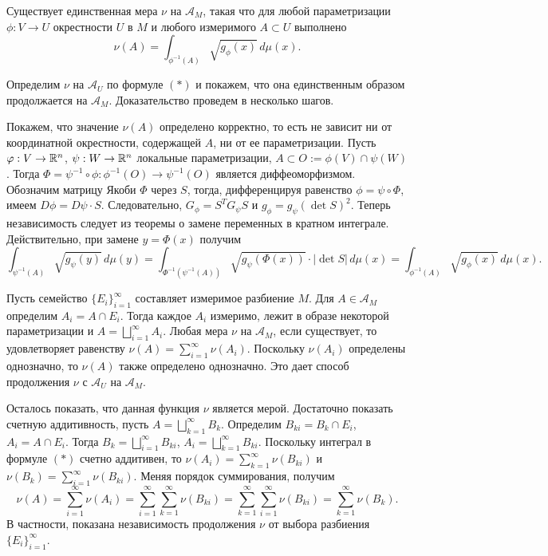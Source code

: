 

\begin{theorem}
	Существует единственная мера $\nu$ на $\mathcal{A}_M$, такая что для любой параметризации $\phi : V \to U$ окрестности $U$ в $M$ и любого измеримого $A \subset U$ выполнено 
	\[ \nu(A) = \int_{\phi^{-1}(A)} \sqrt{g_{\phi}(x)} \, d \mu(x). \tag{$*$}\]
\end{theorem}

\begin{myproof}
	Определим $\nu$ на $\mathcal{A}_U$ по формуле $(*)$ и покажем, что она единственным образом продолжается на $\mathcal{A}_M$.
	Доказательство проведем в несколько шагов.

	\vspace{5pt}
	Покажем, что значение $\nu(A)$ определено корректно, то есть не зависит ни от координатной окрестности, содержащей $A$, ни от ее параметризации. 
	Пусть $\varphi : V \to \mathbb{R}^n$, $\psi : W \to \mathbb{R}^n$ локальные параметризации, $A \subset O := \phi(V) \cap \psi(W)$.
	Тогда $\Phi = \psi^{-1} \circ \phi : \phi^{-1}(O) \to \psi^{-1}(O)$ является диффеоморфизмом. 
	Обозначим матрицу Якоби $\Phi$ через $S$, тогда, дифференцируя равенство $\phi = \psi \circ \Phi$, имеем 
	$D \phi = D \psi \cdot S$. Следовательно, $G_{\phi} = S^T G_{\psi} S$ и $g_{\phi} = g_{\psi} (\det S)^2$. 
	Теперь независимость следует из теоремы о замене переменных в кратном интеграле. 
	Действительно, при замене $y = \Phi(x)$ получим  
	\[ \int_{\psi^{-1}(A)} \sqrt{g_{\psi}(y)} \, d \mu(y) = \int_{\Phi^{-1}(\psi^{-1}(A))} \sqrt{g_{\psi} (\Phi(x))} \cdot |\det S| \, d \mu(x) = \int_{\phi^{-1}(A)} \sqrt{g_{\phi}(x)} \, d \mu (x). \]

	\vspace{5pt}
	Пусть семейство $\{E_i\}_{i=1}^{\infty}$ составляет измеримое разбиение $M$. 
	Для $A \in \mathcal{A}_M$ определим $A_i = A \cap E_i$. 
	Тогда каждое $A_i$ измеримо, лежит в образе некоторой параметризации и $A = \bigsqcup_{i=1}^{\infty} A_i$.
	Любая мера $\nu$ на $\mathcal{A}_M$, если существует, то удовлетворяет равенству $\nu(A) = \sum \limits_{i=1}^{\infty} \nu(A_i)$.
	Поскольку $\nu(A_i)$ определены однозначно, то $\nu(A)$ также определено однозначно. 
	Это дает способ продолжения $\nu$ с $\mathcal{A}_U$ на $\mathcal{A}_M$.

	\vspace{5pt}
	Осталось показать, что данная функция $\nu$ является мерой. 
	Достаточно показать счетную аддитивность, пусть $A = \bigsqcup_{k=1}^{\infty} B_k$. 
	Определим $B_{ki} = B_k \cap E_i$, $A_i = A \cap E_i$. Тогда 
	$B_k = \bigsqcup_{i=1}^{\infty} B_{ki}$, $A_i = \bigsqcup_{k=1}^{\infty} B_{ki}$. 
	Поскольку интеграл в формуле $(*)$ счетно аддитивен, то $\nu(A_i) = \sum \limits_{k=1}^{\infty} \nu(B_{ki})$ и $\nu(B_k) = \sum \limits_{i=1}^{\infty} \nu(B_{ki})$.
	Меняя порядок суммирования, получим 
	\[ \nu(A) = \sum \limits_{i=1}^{\infty} \nu(A_i) = \sum \limits_{i=1}^{\infty} \sum \limits_{k=1}^{\infty} \nu(B_{ki}) = \sum \limits_{k=1}^{\infty} \sum \limits_{i=1}^{\infty} \nu(B_{ki}) = \sum \limits_{k=1}^{\infty} \nu(B_k). \]
	В частности, показана независимость продолжения $\nu$ от выбора разбиения $\{E_i\}_{i=1}^{\infty}$. 
\end{myproof}



